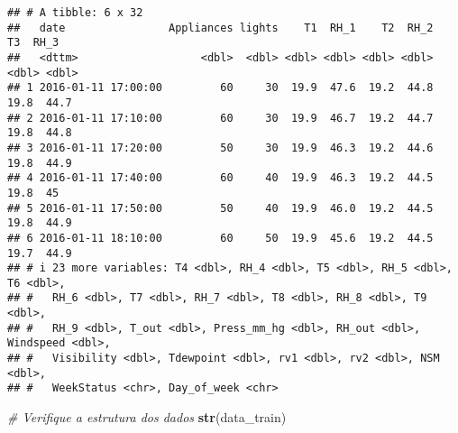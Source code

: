 \documentclass[
]{article}
\newenvironment{Shaded}{\begin{snugshade}}{\end{snugshade}}
\newcommand{\CommentTok}[1]{\textcolor[rgb]{0.56,0.35,0.01}{\textit{#1}}}
\newcommand{\FunctionTok}[1]{\textcolor[rgb]{0.13,0.29,0.53}{\textbf{#1}}}
\newcommand{\NormalTok}[1]{#1}
\begin{document}
\begin{verbatim}
## # A tibble: 6 x 32
##   date                Appliances lights    T1  RH_1    T2  RH_2    T3  RH_3
##   <dttm>                   <dbl>  <dbl> <dbl> <dbl> <dbl> <dbl> <dbl> <dbl>
## 1 2016-01-11 17:00:00         60     30  19.9  47.6  19.2  44.8  19.8  44.7
## 2 2016-01-11 17:10:00         60     30  19.9  46.7  19.2  44.7  19.8  44.8
## 3 2016-01-11 17:20:00         50     30  19.9  46.3  19.2  44.6  19.8  44.9
## 4 2016-01-11 17:40:00         60     40  19.9  46.3  19.2  44.5  19.8  45  
## 5 2016-01-11 17:50:00         50     40  19.9  46.0  19.2  44.5  19.8  44.9
## 6 2016-01-11 18:10:00         60     50  19.9  45.6  19.2  44.5  19.7  44.9
## # i 23 more variables: T4 <dbl>, RH_4 <dbl>, T5 <dbl>, RH_5 <dbl>, T6 <dbl>,
## #   RH_6 <dbl>, T7 <dbl>, RH_7 <dbl>, T8 <dbl>, RH_8 <dbl>, T9 <dbl>,
## #   RH_9 <dbl>, T_out <dbl>, Press_mm_hg <dbl>, RH_out <dbl>, Windspeed <dbl>,
## #   Visibility <dbl>, Tdewpoint <dbl>, rv1 <dbl>, rv2 <dbl>, NSM <dbl>,
## #   WeekStatus <chr>, Day_of_week <chr>
\end{verbatim}

\begin{Shaded}
\begin{Highlighting}[]
\CommentTok{\# Verifique a estrutura dos dados}
\FunctionTok{str}\NormalTok{(data\_train)}
\end{Highlighting}
\end{Shaded}
\end{document}
